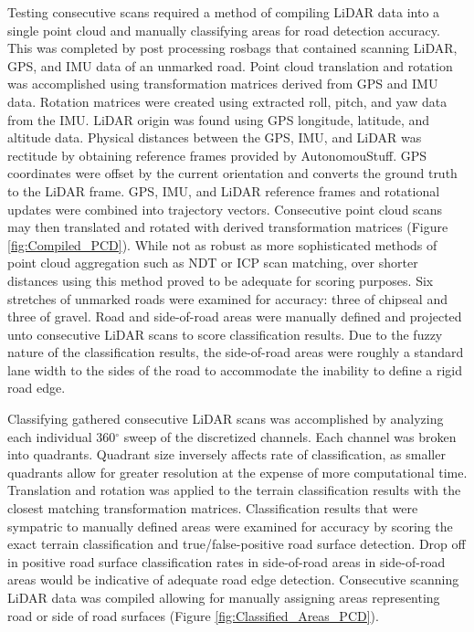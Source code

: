\documentclass[journal,onecolumn]{IEEEtran}
\begin{document}
	{Testing consecutive scans required a method of compiling LiDAR data into a single point cloud and manually classifying areas for road detection accuracy. This was completed by post processing rosbags that contained scanning LiDAR, GPS, and IMU data of an unmarked road. Point cloud translation and rotation was accomplished using transformation matrices derived from GPS and IMU data. Rotation matrices were created using extracted roll, pitch, and yaw data from the IMU. LiDAR origin was found using GPS longitude, latitude, and altitude data. Physical distances between the GPS, IMU, and LiDAR was rectitude by obtaining reference frames provided by AutonomouStuff. GPS coordinates were offset by the current orientation and converts the ground truth to the LiDAR frame. GPS, IMU, and LiDAR reference frames and rotational updates were combined into trajectory vectors. Consecutive point cloud scans may then translated and rotated with derived transformation matrices (Figure \ref{fig:Compiled_PCD}). While not as robust as more sophisticated methods of point cloud aggregation such as NDT or ICP scan matching, over shorter distances using this method proved to be adequate for scoring purposes. Six stretches of unmarked roads were examined for accuracy: three of chipseal and three of gravel. Road and side-of-road areas were manually defined and projected unto consecutive LiDAR scans to score classification results. Due to the fuzzy nature of the classification results, the side-of-road areas were roughly a standard lane width to the sides of the road to accommodate the inability to define a rigid road edge.}
	
	
	
	{Classifying gathered consecutive LiDAR scans was accomplished by analyzing each individual 360$^{\circ}$ sweep of the discretized channels. Each channel was broken into quadrants. Quadrant size inversely affects rate of classification, as smaller quadrants allow for greater resolution at the expense of more computational time. Translation and rotation was applied to the terrain classification results with the closest matching transformation matrices. Classification results that were sympatric to manually defined areas were examined for accuracy by scoring the exact terrain classification and true/false-positive road surface detection. Drop off in positive road surface classification rates in side-of-road areas in side-of-road areas would be indicative of adequate road edge detection. Consecutive scanning LiDAR data was compiled allowing for manually assigning areas representing road or side of road surfaces (Figure \ref{fig:Classified_Areas_PCD}).}
	
\end{document}
